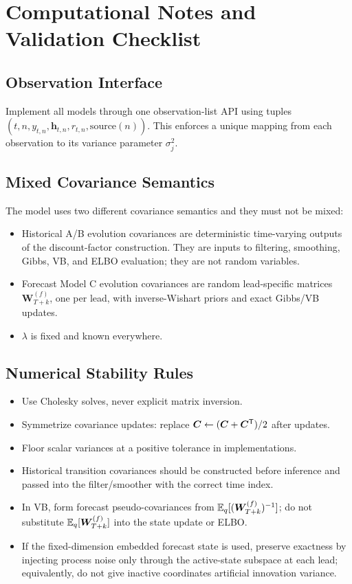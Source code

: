 \section{Computational Notes and Validation Checklist}

\subsection{Observation Interface}
Implement all models through one observation-list API using tuples
$(t,n,y_{t,n},\bm h_{t,n},r_{t,n},\text{source}(n))$.
This enforces a unique mapping from each observation to its variance parameter
$\sigma_j^2$.

\subsection{Mixed Covariance Semantics}
The model uses two different covariance semantics and they must not be mixed:
\begin{itemize}
\item Historical A/B evolution covariances are deterministic time-varying outputs of the
      discount-factor construction. They are inputs to filtering, smoothing, Gibbs, VB, and ELBO
      evaluation; they are not random variables.
\item Forecast Model C evolution covariances are random lead-specific matrices
      $\bm W_{T+k}^{(f)}$, one per lead, with inverse-Wishart priors and exact Gibbs/VB updates.
\item $\lambda$ is fixed and known everywhere.
\end{itemize}

\subsection{Numerical Stability Rules}
\begin{itemize}
\item Use Cholesky solves, never explicit matrix inversion.
\item Symmetrize covariance updates: replace $\bm C\leftarrow(\bm C+\bm C^{\mathsf{T}})/2$ after updates.
\item Floor scalar variances at a positive tolerance in implementations.
\item Historical transition covariances should be constructed before inference and passed into the
      filter/smoother with the correct time index.
\item In VB, form forecast pseudo-covariances from
      $\mathbb{E}_q[(\bm W_{T+k}^{(f)})^{-1}]$; do not substitute $\mathbb{E}_q[\bm W_{T+k}^{(f)}]$
      into the state update or ELBO.
\item If the fixed-dimension embedded forecast state is used, preserve exactness by injecting
      process noise only through the active-state subspace at each lead; equivalently, do not
      give inactive coordinates artificial innovation variance.
\end{itemize}

